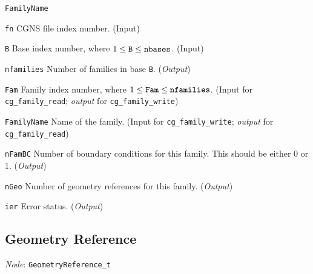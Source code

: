 \begin{Ventryi}{\texttt{FamilyName}}\raggedright
\item [\texttt{fn}]
      CGNS file index number.
      (\textcolor{input}{Input})
\item [\texttt{B}]
      Base index number, where $1 \leq \text{\texttt{B}} \leq \text{\texttt{nbases}}$.
      (\textcolor{input}{Input})
\item [\texttt{nfamilies}]
      Number of families in base \texttt{B}.
      (\textcolor{output}{\textit{Output}})
\item [\texttt{Fam}]
      Family index number, where $1 \leq \text{\texttt{Fam}} \leq \text{\texttt{nfamilies}}$.
      (\textcolor{input}{Input} for \texttt{cg\_family\_read};
      \textcolor{output}{\textit{output}} for \texttt{cg\_family\_write})
\item [\texttt{FamilyName}]
      Name of the family.
      (\textcolor{input}{Input} for \texttt{cg\_family\_write};
      \textcolor{output}{\textit{output}} for \texttt{cg\_family\_read})
\item [\texttt{nFamBC}]
      Number of boundary conditions for this family.
      This should be either 0 or 1.
      (\textcolor{output}{\textit{Output}})
\item [\texttt{nGeo}]
      Number of geometry references for this family.
      (\textcolor{output}{\textit{Output}})
\item [\texttt{ier}]
      Error status.
      (\textcolor{output}{\textit{Output}})
\end{Ventryi}

\newpage
\subsection{Geometry Reference}
\label{s:geometry}

\noindent
\textit{Node}: \texttt{GeometryReference\_t}

